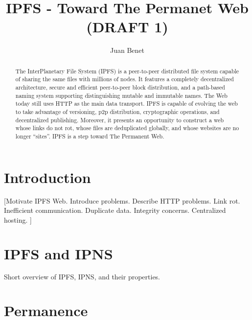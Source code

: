 \documentclass{sig-alternate}
\begin{document}
\title{IPFS - Toward The Permanet Web (DRAFT 1)}
\subtitle{}


\author{
%
%
\alignauthor
  Juan Benet\\
}

\maketitle
\begin{abstract}
The InterPlanetary File System (IPFS) is a peer-to-peer distributed file system
capable of sharing the same files with millions of nodes. It features a completely decentralized architecture, secure and efficient peer-to-peer block distribution, and a path-based naming system supporting distinguishing mutable and immutable names. The Web today still uses HTTP as the main data transport. IPFS is capable of evolving the web to take advantage of versioning, p2p distribution, cryptographic operations, and decentralized publishing. Moreover, it presents an opportunity to construct a web whose links do not rot, whose files are deduplicated globally, and whose websites are no longer ``sites''. IPFS is a step toward The Permanent Web.
\end{abstract}

\section{Introduction}

[Motivate IPFS Web. Introduce problems. Describe HTTP problems. Link rot. Inefficient communication. Duplicate data. Integrity concerns. Centralized hosting. ]

\section{IPFS and IPNS}

Short overview of IPFS, IPNS, and their properties.

\section{Permanence}
\end{document}
